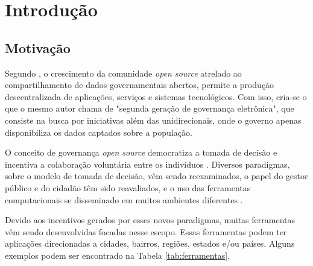 \chapter[Introdução]{Introdução}
\label{cap:cap1}
\par
\section{Motivação}
\label{sec:motivacao}
Segundo , o crescimento da comunidade \textit{open source} atrelado ao compartilhamento de dados governamentais abertos, permite a produção
descentralizada de aplicações, serviços e sistemas tecnológicos. Com isso, cria-se o que o mesmo autor chama de "segunda geração de governança eletrônica", que consiste na busca
por iniciativas além das unidirecionais, onde o governo apenas disponibiliza os dados captados sobre a população.

\par
O conceito de governança \textit{open source} democratiza a tomada de decisão e incentiva a colaboração voluntária entre os indivíduos \cite{rushkoff2003open}.
Diversos paradigmas, sobre o modelo de tomada de decisão, vêm sendo reexaminados, o papel do gestor público e do cidadão têm sido reavaliados,
e o uso das ferramentas computacionais se disseminado em muitos ambientes diferentes \cite{medeiros2009novos}.

\par
Devido aos incentivos gerados por esses novos paradigmas, muitas ferramentas vêm sendo desenvolvidas focadas nesse escopo.
Essas ferramentas podem ter aplicações direcionadas a cidades, bairros, regiões, estados e/ou países.  
Alguns exemplos podem ser encontrado na Tabela \ref{tab:ferramentas}.

